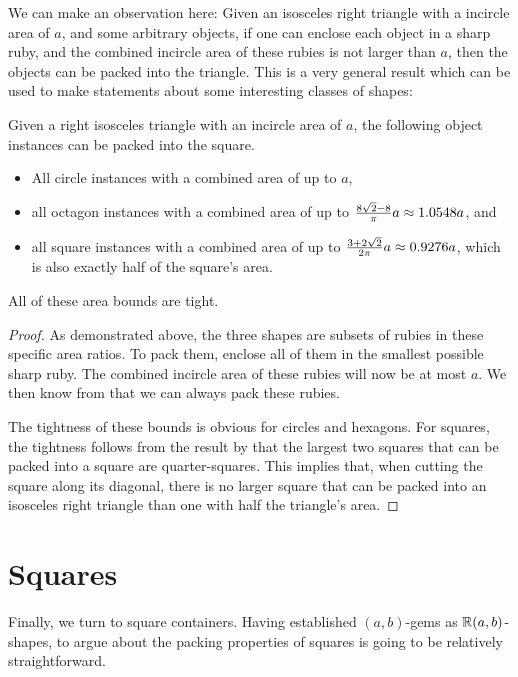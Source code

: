 \documentclass[a4paper,style=print,oneside,bibliography=totoc,nexus,lnum,extramargin]{tubsbook}
\begin{document}
We can make an observation here: Given an isosceles right triangle with a incircle area of $a$, and some arbitrary objects, if one can enclose each object in a sharp ruby, and the combined incircle area of these rubies is not larger than $a$, then the objects can be packed into the triangle. This is a very general result which can be used to make statements about some interesting classes of shapes:

\begin{corollary}
    Given a right isosceles triangle with an incircle area of $a$, the following object instances can be packed into the square.

    \begin{itemize}
        \item All circle instances with a combined area of up to $a$,
        \item all octagon instances with a combined area of up to $\frac{8\sqrt{2}-8}{\pi}a \approx 1.0548a$, and
        \item all square instances with a combined area of up to $\frac{3+2\sqrt{2}}{2\pi}a \approx 0.9276a$, which is also exactly half of the square's area.
    \end{itemize}

    All of these area bounds are tight.
\end{corollary}

\begin{proof}
    As demonstrated above, the three shapes are subsets of rubies in these specific area ratios. To pack them, enclose all of them in the smallest possible sharp ruby. The combined incircle area of these rubies will now be at most $a$. We then know from  that we can always pack these rubies.

    The tightness of these bounds is obvious for circles and hexagons. For squares, the tightness follows from the result by \textcite{gobel1979geometrical} that the largest two squares that can be packed into a square are quarter-squares. This implies that, when cutting the square along its diagonal, there is no larger square that can be packed into an isosceles right triangle than one with half the triangle's area.
\end{proof}

\section{Squares}

Finally, we turn to square containers. Having established $(a,b)$-gems as $\mathbb{R}(a,b)$-shapes, to argue about the packing properties of squares is going to be relatively straightforward.
\end{document}
